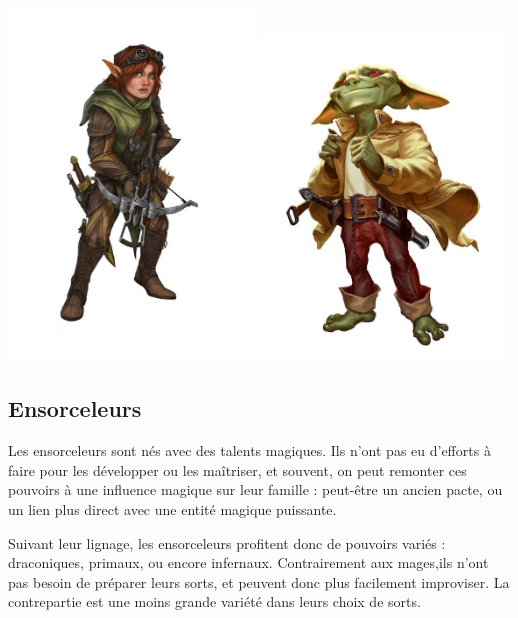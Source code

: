 \documentclass[10pt,a4paper]{book}
\begin{document}
\includegraphics[width=0.49\textwidth]{roublard 1}
\includegraphics[width=0.49\textwidth]{roublard 2}
\subsection{Ensorceleurs}
Les ensorceleurs sont nés avec des talents magiques. Ils n'ont pas eu d'efforts à faire pour les développer ou les maîtriser, et souvent, on peut remonter ces pouvoirs à une influence magique sur leur famille : peut-être un ancien pacte, ou un lien plus direct avec une entité magique puissante.

Suivant leur lignage, les ensorceleurs profitent donc de pouvoirs variés : draconiques, primaux, ou encore infernaux. Contrairement aux mages,ils n'ont pas besoin de préparer leurs sorts, et peuvent donc plus facilement improviser. La contrepartie est une moins grande variété dans leurs choix de sorts.
\end{document}
